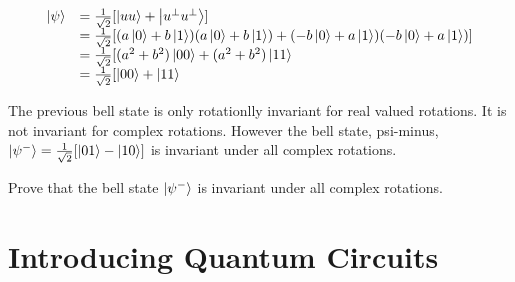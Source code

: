 \[ \begin{array}{ll}
\left|\psi\right\rangle
& =
\frac{1}{\sqrt{2}} [\left|uu\right\rangle + \left|u^{\perp}u^{\perp}\right\rangle] \\
& =
\frac{1}{\sqrt{2}} [(a\left|0\right\rangle + b\left|1\right\rangle)(a\left|0\right\rangle + b\left|1\right\rangle) 
+ (-b\left|0\right\rangle + a\left|1\right\rangle)(-b\left|0\right\rangle + a\left|1\right\rangle)]  \\ 
& =
\frac{1}{\sqrt{2}} [(a^2 + b^2)\left|00\right\rangle + (a^2 + b^2)\left|11\right\rangle \\ 
& =
\frac{1}{\sqrt{2}} [\left|00\right\rangle + \left|11\right\rangle \\ 
\end{array}\] 

\frmrule

The previous bell state is only rotationlly invariant for real valued rotations. 
It is not invariant for complex rotations. However the bell state, 
psi-minus, $\left|\psi^{-}\right\rangle = \frac{1}{\sqrt{2}} [\left|01\right\rangle - \left|10\right\rangle]$
is invariant under all complex rotations.

\begin{example}
Prove that the bell state $\left|\psi^{-}\right\rangle$ is invariant under all complex rotations.
\end{example}




\section{Introducing Quantum Circuits}



